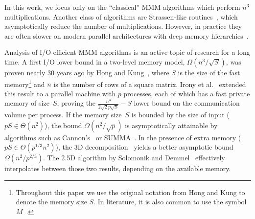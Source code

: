 \documentclass[sigplan,review,anonymous,10pt]{acmart}\settopmatter{printfolios=true,printccs=false,printacmref=false}
\newcommand\mac[1]{\textcolor{red}{[Mac: #1]}}
\begin{document}
In this work, we focus only on the ``classical'' MMM algorithms which perform 
$n^3$ multiplications. Another class of algorithms
are Strassen-like routines~\cite{Strassen}, which asymptotically reduce the
number of multiplications. However, in practice they are often slower on 
modern 
parallel architectures with deep memory hierarchies~\cite{strassenVsClassic}.

Analysis of I/O-efficient MMM algorithms is an active topic of research for a 
long time. 
A first I/O lower bound in a two-level 
memory
model, $\Omega\left({n^3}/{\sqrt{S}}\right)$, was proven nearly 30 years ago by
Hong and Kung~\cite{redblue}, where $S$ is the size of the fast
memory\footnote{Throughout this paper we use the original notation from Hong
and Kung to denote the memory size $S$. In literature, it is also common to use
the symbol $M$~\cite{externalMem,IronyMMM, parallelExMem}.} and $n$ is the
number of rows of a square matrix.
%
%
Irony et al.~\cite{IronyMMM} extended this
result to a parallel machine with $p$ processes,
each of which has a fast private memory of size~$S$, proving the
$\frac{n^3}{2\sqrt{2}p\sqrt{S}} - S$ 
lower bound on the communication volume 
per 
process.
%
%
If the memory size~$S$ is bounded by the size of
input ($pS \in \Theta(n^2)$), the bound
$\Omega\left({n^2}/{\sqrt{p}}\right)$  is asymptotically attainable by
algorithms such as Cannon's~\cite{Cannon} or SUMMA~\cite{summa}. In the
presence of extra memory ($pS \in \Theta(p^{1/3} n^2)$), the 3D
decomposition~\cite{summa3d} yields a better asymptotic bound
$\Omega\left({n^2}/{p^{2/3}}\right)$. The 2.5D algorithm by Solomonik
and Demmel~\cite{25d} effectively interpolates
between those two results, depending on the available
memory.
\end{document}
